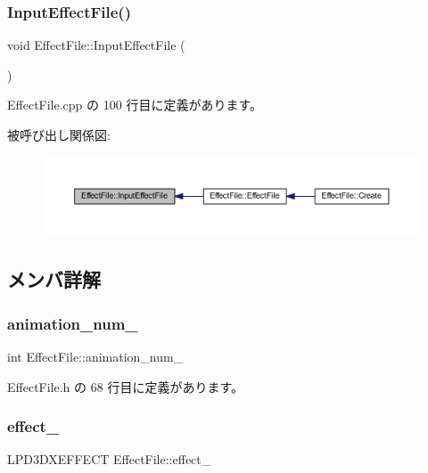\subsubsection{\texorpdfstring{Input\+Effect\+File()}{InputEffectFile()}}
{\footnotesize\ttfamily void Effect\+File\+::\+Input\+Effect\+File (\begin{DoxyParamCaption}{ }\end{DoxyParamCaption})}



 Effect\+File.\+cpp の 100 行目に定義があります。

被呼び出し関係図\+:
\nopagebreak
\begin{figure}[H]
\begin{center}
\leavevmode
\includegraphics[width=350pt]{class_effect_file_a8106530f6c71c81e7e2843cec9fe1094_icgraph}
\end{center}
\end{figure}


\subsection{メンバ詳解}
\mbox{\label{class_effect_file_a991ad3cf78c2fcd2301f7f5e0d30b021}} 
\subsubsection{\texorpdfstring{animation\+\_\+num\+\_\+}{animation\_num\_}}
{\footnotesize\ttfamily int Effect\+File\+::animation\+\_\+num\+\_\+}



 Effect\+File.\+h の 68 行目に定義があります。

\mbox{\label{class_effect_file_a77fb809b585787275652c7803cc472dc}} 
\subsubsection{\texorpdfstring{effect\+\_\+}{effect\_}}
{\footnotesize\ttfamily L\+P\+D3\+D\+X\+E\+F\+F\+E\+CT Effect\+File\+::effect\+\_\+}



